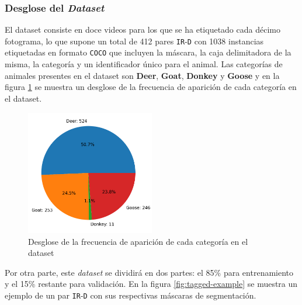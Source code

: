 \documentclass[12pt,a4paper]{report}
\begin{document}
\subsubsection{Desglose del \textit{Dataset}}
El dataset consiste en doce videos para los que se ha etiquetado cada décimo fotograma, lo que supone un total de 412 pares \texttt{IR}-\texttt{D} con 1038 instancias etiquetadas en formato \texttt{COCO} que incluyen la máscara, la caja delimitadora de la misma, la categoría y un identificador único para el animal. Las categorías de animales presentes en el dataset son \textbf{Deer}, \textbf{Goat}, \textbf{Donkey} y \textbf{Goose} y en la figura \ref{fig:dataset-breakdown} se muestra un desglose de la frecuencia de aparición de cada categoría en el dataset.
\begin{figure}
    \centering
    \includegraphics[width=0.5\textwidth]{media/data/dataset_breakdown.png}
    \caption{Desglose de la frecuencia de aparición de cada categoría en el dataset}
    \label{fig:dataset-breakdown}
\end{figure}
Por otra parte, este \textit{dataset} se dividirá en dos partes: el 85\% para entrenamiento y el 15\% restante para validación. En la figura \ref{fig:tagged-example} se muestra un ejemplo de un par \texttt{IR}-\texttt{D} con sus respectivas máscaras de segmentación.
\end{document}
